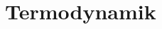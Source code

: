 \documentclass[crop=false, class=memoir]{standalone}
\begin{document}
\section{Termodynamik}
\end{document}
